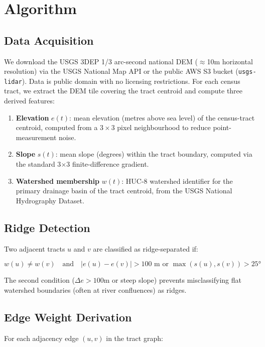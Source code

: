\section{Algorithm}

\subsection{Data Acquisition}

We download the USGS 3DEP 1/3 arc-second national DEM ($\approx$10m horizontal resolution) via the USGS National Map API or the public AWS S3 bucket (\texttt{usgs-lidar}). Data is public domain with no licensing restrictions. For each census tract, we extract the DEM tile covering the tract centroid and compute three derived features:

\begin{enumerate}
  \item \textbf{Elevation} $e(t)$: mean elevation (metres above sea level) of the census-tract centroid, computed from a $3\times 3$ pixel neighbourhood to reduce point-measurement noise.
  \item \textbf{Slope} $s(t)$: mean slope (degrees) within the tract boundary, computed via the standard 3$\times$3 finite-difference gradient.
  \item \textbf{Watershed membership} $w(t)$: HUC-8 watershed identifier for the primary drainage basin of the tract centroid, from the USGS National Hydrography Dataset.
\end{enumerate}

\subsection{Ridge Detection}

Two adjacent tracts $u$ and $v$ are classified as ridge-separated if:

\[
  w(u) \neq w(v) \quad \text{and} \quad |e(u) - e(v)| > 100 \text{ m or } \max(s(u), s(v)) > 25°
\]

The second condition ($\Delta e > 100$m or steep slope) prevents misclassifying flat watershed boundaries (often at river confluences) as ridges.

\subsection{Edge Weight Derivation}

For each adjacency edge $(u,v)$ in the tract graph:


